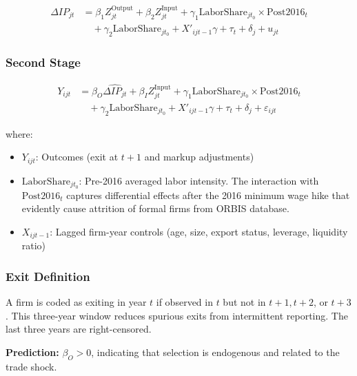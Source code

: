 \documentclass[12pt]{article}
\begin{document}
\begin{equation}
\begin{aligned}
\Delta IP_{jt} &= \beta_1 Z_{jt}^{\text{Output}} + \beta_2 Z_{jt}^{\text{Input}} + \gamma_1 \text{LaborShare}_{jt_0} \times \text{Post2016}_t \\
&\quad + \gamma_2 \text{LaborShare}_{jt_0} + X'_{ijt-1} \gamma + \tau_t + \delta_j + u_{jt}
\end{aligned}
\tag{1}
\end{equation}

\subsubsection{Second Stage}

\begin{equation}
\begin{aligned}
Y_{ijt} &= \beta_O \widehat{\Delta IP_{jt}} + \beta_I Z_{jt}^{\text{Input}} + \gamma_1 \text{LaborShare}_{jt_0} \times \text{Post2016}_t \\
&\quad + \gamma_2 \text{LaborShare}_{jt_0} + X'_{ijt-1} \gamma + \tau_t + \delta_j + \varepsilon_{ijt}
\end{aligned}
\tag{2}
\end{equation}

where:
\begin{itemize}
    \item $Y_{ijt}$: Outcomes (exit at $t+1$ and markup adjustments)
    \item $\text{LaborShare}_{jt_0}$: Pre-2016 averaged labor intensity. The interaction with $\text{Post2016}_t$ captures differential effects after the 2016 minimum wage hike that evidently cause attrition of formal firms from ORBIS database.
    \item $X_{ijt-1}$: Lagged firm-year controls (age, size, export status, leverage, liquidity ratio)
\end{itemize}

\subsubsection{Exit Definition}

A firm is coded as exiting in year $t$ if observed in $t$ but not in $t+1, t+2$, or $t+3$. This three-year window reduces spurious exits from intermittent reporting. The last three years are right-censored.

\textbf{Prediction:} $\beta_O > 0$, indicating that selection is endogenous and related to the trade shock.
\end{document}
